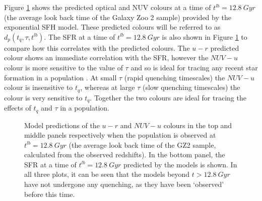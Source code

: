 \documentclass{mn2e}
\begin{document}
Figure \ref{pred} shows the predicted optical and NUV colours at a time of $t^{lb} = 12.8 ~Gyr$ (the average look back time of the Galaxy Zoo 2 sample) provided by the exponential SFH model. These predicted colours will be referred to as $d_{p}(t_{q}, \tau, t^{lb})$. The SFR at a time of $t^{lb}=12.8~Gyr$ is also shown in Figure \ref{pred} to compare how this correlates with the predicted colours. The $u-r$ predicted colour shows an immediate correlation with the SFR, however the $NUV-u$ colour is more sensitive to the value of $\tau$ and so is ideal for tracing any recent star formation in a population . At small $\tau$ (rapid quenching timescales) the $NUV-u$ colour is insensitive to $t_{q}$, whereas at large $\tau$ (slow quenching timescales) the colour is very sensitive to $t_{q}$. Together the two colours are ideal for tracing the effects of $t_{q}$ and $\tau$ in a population. 



\begin{figure}
\caption{Model predictions of the $u-r$ and $NUV-u$ colours in the top and  middle panels respectively when the population is observed at $t^{lb} = 12.8~Gyr$ (the average look back time of the GZ2 sample, calculated from the observed redshifts). In the bottom panel, the SFR at a time of $t^{lb} = 12.8 ~Gyr$ predicted by the models is shown. In all three plots, it can be seen that the models beyond $t > 12.8~Gyr$ have not undergone any quenching, as they have been `observed' before this time.}
\label{pred}
\end{figure}
\end{document}
